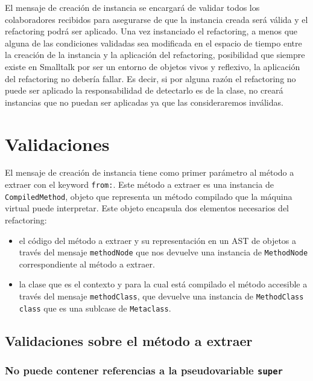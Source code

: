 El mensaje de creación de instancia se encargará de validar todos los colaboradores recibidos para
asegurarse de que la instancia creada será válida y el refactoring podrá ser aplicado. Una vez
instanciado el refactoring, a menos que alguna de las condiciones validadas sea modificada en el
espacio de tiempo entre la creación de la instancia y la aplicación del refactoring, posibilidad que
siempre existe en Smalltalk por ser un entorno de objetos vivos y reflexivo, la aplicación del
refactoring no debería fallar. Es decir, si por alguna razón el refactoring no puede ser aplicado la
responsabilidad de detectarlo es de la clase, no creará instancias que no puedan ser aplicadas ya
que las consideraremos inválidas.

\section{Validaciones}
El mensaje de creación de instancia tiene como primer parámetro al método a extraer con el keyword
\lstinline{from:}. Este método a extraer es una instancia de \lstinline{CompiledMethod}, objeto que 
representa un método compilado que la máquina virtual puede interpretar. Este objeto encapsula dos
elementos necesarios del refactoring:

\begin{itemize}
    \item el código del método a extraer y su representación en un AST de objetos a través del mensaje
    \lstinline{methodNode} que nos devuelve una instancia de \lstinline{MethodNode} correspondiente
    al método a extraer.
    \item la clase que es el contexto y para la cual está compilado el método accesible a través
    del mensaje \lstinline{methodClass}, que devuelve una instancia de \lstinline{MethodClass class}
    que es una sublcase de \lstinline{Metaclass}.
\end{itemize}

\subsection*{Validaciones sobre el método a extraer}

\subsubsection*{No puede contener referencias a la pseudovariable \lstinline{super}}

